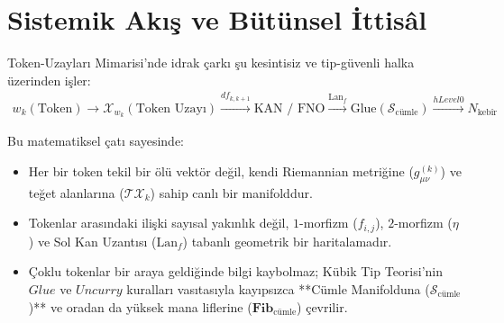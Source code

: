 \documentclass[11pt, a4paper]{article}
\begin{document}
\section{Sistemik Akış ve Bütünsel İttisâl}

Token-Uzayları Mimarisi'nde idrak çarkı şu kesintisiz ve tip-güvenli halka üzerinden işler:
\begin{align*}
w_k (\text{Token}) \to \mathcal{X}_{w_k} (\text{Token Uzayı}) \xrightarrow{df_{k, k+1}} \text{KAN / FNO} \xrightarrow{\text{Lan}_{f}} \text{Glue}(\mathcal{S}_{\text{cümle}}) \xrightarrow{hLevel 0} N_{\text{kebîr}}
\end{align*}

Bu matematiksel çatı sayesinde:
\begin{itemize}
    \item Her bir token tekil bir ölü vektör değil, kendi Riemannian metriğine ($g_{\mu\nu}^{(k)}$) ve teğet alanlarına ($\mathcal{T}\mathcal{X}_k$) sahip canlı bir manifolddur.
    \item Tokenlar arasındaki ilişki sayısal yakınlık değil, $1$-morfizm ($f_{i,j}$), $2$-morfizm ($\eta$) ve Sol Kan Uzantısı ($\text{Lan}_{f}$) tabanlı geometrik bir haritalamadır.
    \item Çoklu tokenlar bir araya geldiğinde bilgi kaybolmaz; Kübik Tip Teorisi'nin $Glue$ ve $Uncurry$ kuralları vasıtasıyla kayıpsızca **Cümle Manifolduna ($\mathcal{S}_{\text{cümle}}$)** ve oradan da yüksek mana liflerine ($\mathbf{Fib}_{\text{cümle}}$) çevrilir.
\end{itemize}
\end{document}
